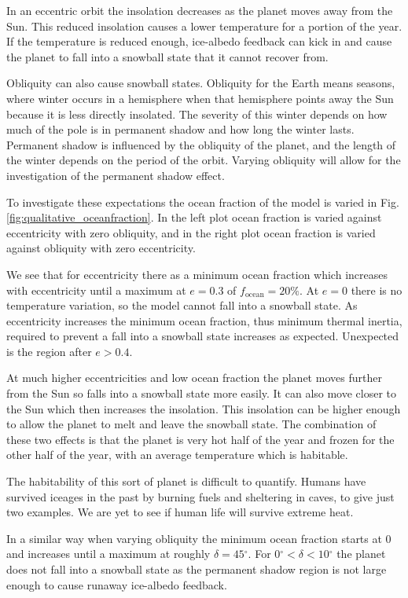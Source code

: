 \documentclass[12pt, onecolumn]{revtex4-2}    %
\newcommand{\degrees}{\ensuremath{^{\circ}}}
\begin{document}
In an eccentric orbit the insolation decreases as the planet moves away from the Sun.
This reduced insolation causes a lower temperature for a portion of the year.
If the temperature is reduced enough, ice-albedo feedback can kick in and cause the planet to fall into a snowball state that it cannot recover from.

Obliquity can also cause snowball states.
Obliquity for the Earth means seasons, where winter occurs in a hemisphere when that hemisphere points away the Sun because it is less directly insolated.
The severity of this winter depends on how much of the pole is in permanent shadow and how long the winter lasts.
Permanent shadow is influenced by the obliquity of the planet, and the length of the winter depends on the period of the orbit.
Varying obliquity will allow for the investigation of the permanent shadow effect.

To investigate these expectations the ocean fraction of the model is varied in Fig. \ref{fig:qualitative_oceanfraction}.
In the left plot ocean fraction is varied against eccentricity with zero obliquity, and in the right plot ocean fraction is varied against obliquity with zero eccentricity.

We see that for eccentricity there as a minimum ocean fraction which increases with eccentricity until a maximum at $e=0.3$ of $f_\text{ocean} = 20\%$.
At $e=0$ there is no temperature variation, so the model cannot fall into a snowball state.
As eccentricity increases the minimum ocean fraction, thus minimum thermal inertia, required to prevent a fall into a snowball state increases as expected.
Unexpected is the region after $e > 0.4$.

At much higher eccentricities and low ocean fraction the planet moves further from the Sun so falls into a snowball state more easily.
It can also move closer to the Sun which then increases the insolation.
This insolation can be higher enough to allow the planet to melt and leave the snowball state.
The combination of these two effects is that the planet is very hot half of the year and frozen for the other half of the year, with an average temperature which is habitable.

The habitability of this sort of planet is difficult to quantify.
Humans have survived iceages in the past by burning fuels and sheltering in caves, to give just two examples.
We are yet to see if human life will survive extreme heat.

In a similar way when varying obliquity the minimum ocean fraction starts at 0 and increases until a maximum at roughly $\delta = 45\degrees$.
For $0\degrees < \delta < 10\degrees$ the planet does not fall into a snowball state as the permanent shadow region is not large enough to cause runaway ice-albedo feedback.
\end{document}
